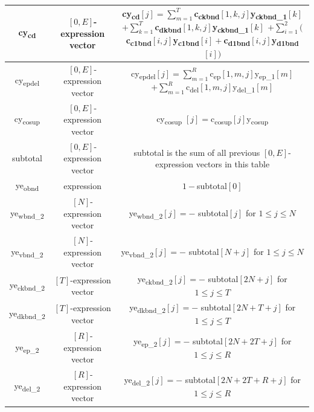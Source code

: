 \documentclass[12pt]{article}
\numberwithin{equation}{section}
\begin{document}
\begin{table}[h]
\begin{tabular}{| c |c|c|}
           cy\textsubscript{cd} &$[0,E]$-expression vector & \makecell{ cy\textsubscript{cd}$[j] = \sum_{m=1}^{T}$c\textsubscript{ckbnd}$[1,k,j]$y\textsubscript{ckbnd\_1}$[k]$\\$+\sum_{k=1}^{T}$c\textsubscript{dkbnd}$[1,k,j]$y\textsubscript{ckbnd\_1}$[k]$\\ $+\sum_{i=1}^{2}($c\textsubscript{c1bnd}$[i,j]$y\textsubscript{c1bnd}$[i]+$c\textsubscript{d1bnd}$[i,j]$y\textsubscript{d1bnd}$[i])$}\\
      \hline
       cy\textsubscript{epdel} &$[0,E]$-expression vector &\makecell{ cy\textsubscript{epdel}$[j] = \sum_{m=1}^{R}$c\textsubscript{ep}$[1,m,j]$y\textsubscript{ep\_1}$[m]$\\$+\sum_{m=1}^{R}$c\textsubscript{del}$[1,m,j]$y\textsubscript{del\_1}$[m]$}\\
      \hline
         cy\textsubscript{cosup} &$[0,E]$-expression vector & cy\textsubscript{cosup} $[j]=$c\textsubscript{cosup}$[j]$y\textsubscript{cosup} \\
         
      \hline
         subtotal &$[0,E]$-expression vector & subtotal is the sum of all previous $[0,E]$-expression vectors in this table  \\
            \hline
            \hline
    
    
    
       ye\textsubscript{obnd} & expression & $1-$subtotal$[0]$ \\
      \hline

              ye\textsubscript{wbnd\_2} &$[N]$-expression vector & ye\textsubscript{wbnd\_2}$[j] = -$ subtotal$[j]$ for $1 \leq j \leq N$ \\
      \hline
             ye\textsubscript{vbnd\_2} & $[N]$-expression vector & ye\textsubscript{vbnd\_2}$[j] = -$ subtotal$[N+j]$ for $1 \leq j \leq N$ \\
      \hline

       ye\textsubscript{ckbnd\_2} & $ [T]$-expression vector& ye\textsubscript{ckbnd\_2}$[j] = -$ subtotal$[2N+j]$ for $1 \leq j \leq T$ \\
          \hline
        ye\textsubscript{dkbnd\_2} & $[T]$-expression vector& ye\textsubscript{dkbnd\_2}$[j] = -$ subtotal$[2N+T+j]$ for $1 \leq j \leq T$\\
    \hline
      ye\textsubscript{ep\_2} & $[R]$-expression vector & ye\textsubscript{ep\_2}$[j] = -$ subtotal$[2N+2T+j]$ for $1 \leq j \leq R$\\
          \hline
        ye\textsubscript{del\_2} & $[R]$-expression vector& ye\textsubscript{del\_2}$[j] = -$ subtotal$[2N+2T+R+j]$ for $1 \leq j \leq R$\\
          \hline
  \hline
  

\end{tabular}
\end{table}
\end{document}
